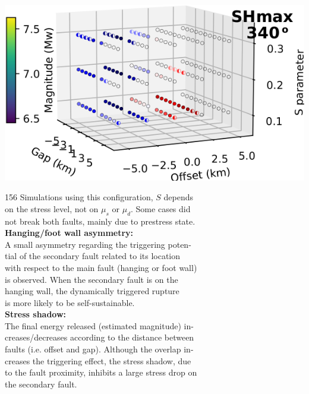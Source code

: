 \begin{poster}
{\begin{minipage}{1\linewidth}
\vskip -0.1cm \centering \includegraphics[width=0.9\linewidth]{images/tests_shmax340}
\end{minipage} 
\vskip 0.2cm
156 Simulations using this configuration, $S$ depends \\
on the stress level, not on $\mu_s$ or $\mu_d$. Some cases did \\
not break both faults, mainly due to prestress state.\\
\vskip -0.4cm
\textbf{Hanging/foot wall asymmetry:} \\
\vskip -0.4cm
A small asymmetry regarding the triggering poten-\\
tial of the secondary fault related to its location \\
with respect to the main fault (hanging or foot wall)\\
is observed. When the secondary fault is on the \\
hanging wall, the dynamically triggered rupture \\
is more likely to be self-sustainable. \\
\vskip -0.4cm
\textbf{Stress shadow:} \\
\vskip -0.4cm
The final energy released (estimated magnitude) in-\\
creases/decreases according to the distance between \\
faults (i.e. offset and gap). Although the overlap in-\\
creases the triggering effect, the stress shadow, due \\
to the fault proximity, inhibits a large stress drop on\\
the secondary fault.
}


\end{poster}
